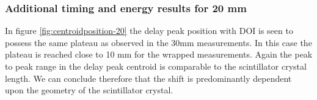 \subsubsection{Additional timing and energy results for 20 mm}
In figure \ref{fig:centroidposition-20} the delay peak position with DOI is seen to possess the same plateau as observed in the 30mm measurements. In this case the plateau is reached close to 10 mm for the wrapped measurements. Again the peak to peak range in the delay peak centroid is comparable to the scintillator crystal length. We can conclude therefore that the shift is predominantly dependent upon the geometry of the scintillator crystal. 